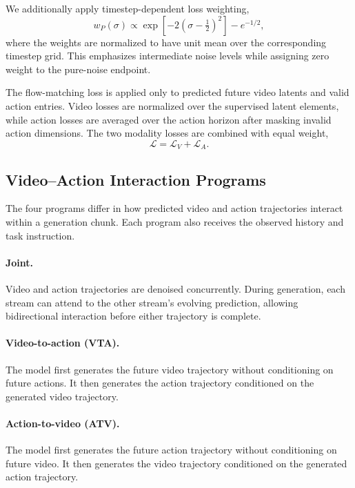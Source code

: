 We additionally apply timestep-dependent loss weighting,
\begin{equation}
w_P(\sigma)
\propto
\exp\!\left[-2\left(\sigma-\tfrac{1}{2}\right)^2\right]
-
e^{-1/2},
\end{equation}
where the weights are normalized to have unit mean over the
corresponding timestep grid. This emphasizes intermediate noise
levels while assigning zero weight to the pure-noise endpoint.

The flow-matching loss is applied only to predicted future video
latents and valid action entries. Video losses are normalized over
the supervised latent elements, while action losses are averaged
over the action horizon after masking invalid action dimensions.
The two modality losses are combined with equal weight,
\begin{equation}
\mathcal{L}
=
\mathcal{L}_{V}
+
\mathcal{L}_{A}.
\end{equation}

\subsection{Video--Action Interaction Programs}
\label{sec:supp-programs}

The four programs differ in how predicted video and action
trajectories interact within a generation chunk. Each program
also receives the observed history and task instruction.

\paragraph{Joint.}
Video and action trajectories are denoised concurrently. During
generation, each stream can attend to the other stream's evolving
prediction, allowing bidirectional interaction before either
trajectory is complete.

\paragraph{Video-to-action (VTA).}
The model first generates the future video trajectory without
conditioning on future actions. It then generates the action
trajectory conditioned on the generated video trajectory.

\paragraph{Action-to-video (ATV).}
The model first generates the future action trajectory without
conditioning on future video. It then generates the video trajectory
conditioned on the generated action trajectory.

